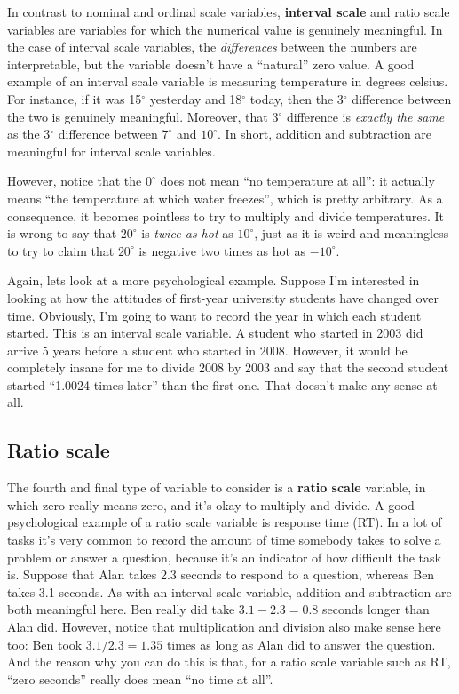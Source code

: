 \documentclass[]{book}
\begin{document}
In contrast to nominal and ordinal scale variables, \textbf{interval scale} and ratio scale variables are variables for which the numerical value is genuinely meaningful. In the case of interval scale variables, the {\emph{differences}} between the numbers are interpretable, but the variable doesn't have a ``natural'' zero value. A good example of an interval scale variable is measuring temperature in degrees celsius. For instance, if it was 15\(^\circ\) yesterday and 18\(^\circ\) today, then the 3\(^\circ\) difference between the two is genuinely meaningful. Moreover, that 3\(^\circ\) difference is {\emph{exactly the same}} as the 3\(^\circ\) difference between \(7^\circ\) and \(10^\circ\). In short, addition and subtraction are meaningful for interval scale variables.

However, notice that the \(0^\circ\) does not mean ``no temperature at all'': it actually means ``the temperature at which water freezes'', which is pretty arbitrary. As a consequence, it becomes pointless to try to multiply and divide temperatures. It is wrong to say that \(20^\circ\) is {\emph{twice as hot}} as \(10^\circ\), just as it is weird and meaningless to try to claim that \(20^\circ\) is negative two times as hot as \(-10^\circ\).

Again, lets look at a more psychological example. Suppose I'm interested in looking at how the attitudes of first-year university students have changed over time. Obviously, I'm going to want to record the year in which each student started. This is an interval scale variable. A student who started in 2003 did arrive 5 years before a student who started in 2008. However, it would be completely insane for me to divide 2008 by 2003 and say that the second student started ``1.0024 times later'' than the first one. That doesn't make any sense at all.

\hypertarget{ratio-scale}{%
\subsection{Ratio scale}\label{ratio-scale}}

The fourth and final type of variable to consider is a \textbf{ratio scale} variable, in which zero really means zero, and it's okay to multiply and divide. A good psychological example of a ratio scale variable is response time (RT). In a lot of tasks it's very common to record the amount of time somebody takes to solve a problem or answer a question, because it's an indicator of how difficult the task is. Suppose that Alan takes 2.3 seconds to respond to a question, whereas Ben takes 3.1 seconds. As with an interval scale variable, addition and subtraction are both meaningful here. Ben really did take \(3.1 - 2.3 = 0.8\) seconds longer than Alan did. However, notice that multiplication and division also make sense here too: Ben took \(3.1 / 2.3 = 1.35\) times as long as Alan did to answer the question. And the reason why you can do this is that, for a ratio scale variable such as RT, ``zero seconds'' really does mean ``no time at all''.
\end{document}
